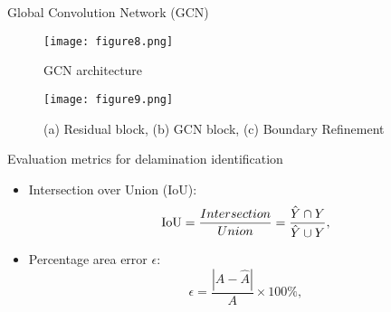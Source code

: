 \documentclass[10pt,aspectratio=169,dvipsnames]{beamer} %
\begin{document}
\begin{frame}{Global Convolution Network (GCN)}
		\begin{minipage}[c]{0.55\textwidth}
			\begin{figure} [h!]
				\centering
				\texttt{[image: figure8.png]}
				\caption{GCN architecture} 
			\end{figure}	
		\end{minipage}
	\hfill
	\begin{minipage}[c]{0.4\textwidth}
		\begin{figure} [h!]
			\centering
			\texttt{[image: figure9.png]}
			\caption{(a) Residual block, (b) GCN block, (c) Boundary Refinement} 
		\end{figure}	
	\end{minipage}
\end{frame}
\begin{frame}{Evaluation metrics for delamination identification}
	\begin{minipage}[c]{0.45\textwidth}
	\begin{itemize}
		\item Intersection over Union (IoU): %
			\begin{equation*}
				\textup{IoU}=\frac{Intersection}{Union}=\frac{\hat{Y} \cap Y}{\hat{Y} \cup Y},
				\label{eqn:iou}
			\end{equation*}
			\item Percentage area error $\epsilon$:
			\begin{equation*}
				\epsilon=\frac{|A-\hat{A}|}{A} \times 100\%,
				\label{eqn:mean_size_error}
			\end{equation*}
	\end{itemize}
	\end{minipage}
	\begin{minipage}[c]{0.45\textwidth}
		\begin{figure}
		\end{figure}
	\end{minipage}
\end{frame}
\end{document}
